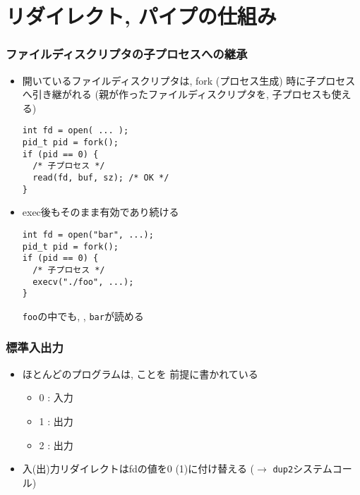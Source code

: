\documentclass[12pt,dvipdfmx]{beamer}
\begin{document}
\section{リダイレクト, パイプの仕組み}

\begin{frame}[fragile]
  \frametitle{ファイルディスクリプタの子プロセスへの継承}
  \begin{itemize}
  \item 開いているファイルディスクリプタは,
    fork (プロセス生成) 時に子プロセスへ引き継がれる
    {\footnotesize (親が作ったファイルディスクリプタを, 子プロセスも使える)}
\begin{lstlisting}
int fd = open( ... );
pid_t pid = fork();
if (pid == 0) {
  /* 子プロセス */
  read(fd, buf, sz); /* OK */
} 
\end{lstlisting}
  \item exec後もそのまま有効であり続ける
\begin{lstlisting}
int fd = open("bar", ...);
pid_t pid = fork();
if (pid == 0) {
  /* 子プロセス */
  execv("./foo", ...);
} 
\end{lstlisting}
{\tt foo}の中でも, , {\tt bar}が読める
\end{itemize}
\end{frame}

\begin{frame}[fragile]
  \frametitle{標準入出力}
  \begin{itemize}
  \item ほとんどのプログラムは,
  ことを
  前提に書かれている
  \begin{itemize}
  \item 0 : 入力 
  \item 1 : 出力 
  \item 2 : 出力 
  \end{itemize}
\item 入(出)力リダイレクトはfdの値を0 (1)に付け替える
  ($\rightarrow$ {\tt dup2}システムコール)
\end{itemize}
\end{frame}
\end{document}
